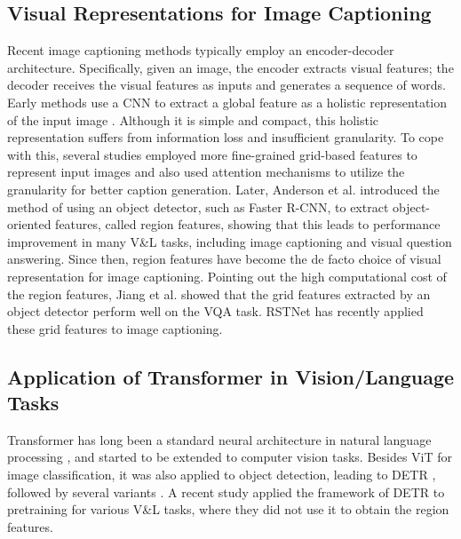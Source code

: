 \documentclass[runningheads]{llncs}
\begin{document}
\subsection{Visual Representations for Image Captioning}
Recent image captioning methods typically employ an encoder-decoder architecture. Specifically, given an image, the encoder extracts visual features; the decoder receives the visual features as inputs and generates a sequence of words. Early methods use a CNN to extract a global feature as a holistic representation of the input image \cite{vinyals2015show,karpathy2015deep}. Although it is simple and compact, this holistic representation suffers from information loss and insufficient granularity. To cope with this, several studies \cite{xu2015show,rennie2017self,lu2017knowing} employed more fine-grained grid-based features to represent input images and also used attention mechanisms to utilize the granularity for better caption generation. Later, Anderson et al. \cite{anderson2018bottom} introduced the method of using an object detector, such as Faster R-CNN, to extract object-oriented features, called region features, showing that this leads to performance improvement in many V\&L tasks, including image captioning and visual question answering. Since then, region features have become the de facto choice of visual representation for image captioning. Pointing out the high computational cost of the region features, Jiang et al. \cite{jiang2020defense} showed that the grid features extracted by an object detector perform well on the VQA task. RSTNet \cite{zhang2021rstnet} has recently applied these grid features to image captioning. 

\subsection{Application of Transformer in Vision/Language Tasks}
Transformer has long been a standard neural architecture in natural language processing \cite{vaswani2017attention,devlin2018bert,radford2018improving}, and started to be extended to computer vision tasks. 
Besides ViT \cite{dosovitskiy2020image} for image classification, it was also applied to object detection, leading to DETR \cite{carion2020end}, followed by several variants \cite{zhu2021deformable,fang2021you,song2021vidt}. A recent study \cite{xu2021e2e} applied the framework of DETR to pretraining for various V\&L tasks, where they did not use it to obtain the region features. 
\end{document}

